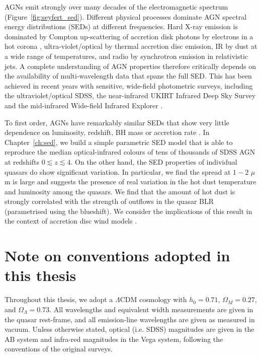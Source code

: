AGNs emit strongly over many decades of the electromagnetic spectrum (Figure~\ref{fig:seyfert_sed}). 
Different physical processes dominate AGN spectral energy distributions (SEDs) at different frequencies. 
Hard X-ray emission is dominated by Compton up-scattering of accretion disk photons by electrons in a hot corona \citep[e.g.][]{sunyaev80}, ultra-violet/optical by thermal accretion disc emission, IR by dust at a wide range of temperatures, and radio by synchrotron emission in relativistic jets.   
A complete understanding of AGN properties therefore critically depends on the availability of multi-wavelength data that spans the full SED. 
This has been achieved in recent years with sensitive, wide-field photometric surveys, including the ultraviolet/optical SDSS, the near-infrared UKIRT Infrared Deep Sky Survey \citep[UKIDSS;][]{lawrence07} and the mid-infrared Wide-field Infrared Explorer \citep[WISE;][]{wright10}. 

To first order, AGNs have remarkably similar SEDs that show very little dependence on luminosity, redshift, BH mass or accretion rate \citep[e.g.][]{elvis12,hao13}. 
In Chapter~\ref{ch:sed}, we build a simple parametric SED model that is able to reproduce the median optical-infrared colours of tens of thousands of SDSS AGN at redshifts $0 \lesssim z \lesssim 4$. 
On the other hand, the SED properties of individual quasars do show significant variation.
In particular, we find the spread at $1-2$ $\mu$m is large and suggests the presence of real variation in the hot dust temperature and luminosity among the quasars.
We find that the amount of hot dust is strongly correlated with the strength of outflows in the quasar BLR (parametrised using the  blueshift). 
We consider the implications of this result in the context of accretion disc wind models \citep[e.g.][]{elitzur06}.

\section{Note on conventions adopted in this thesis}

Throughout this thesis, we adopt a $\Lambda$CDM cosmology with $h_0=0.71$, $\Omega_M=0.27$, and $\Omega_\Lambda=0.73$. 
All wavelengths and equivalent width measurements are given in the quasar rest-frame, and all emission-line wavelengths are given as measured in vacuum.
Unless otherwise stated, optical (i.e. SDSS) magnitudes are given in the AB system and infra-red magnitudes in the Vega system, following the conventions of the original surveys. 



